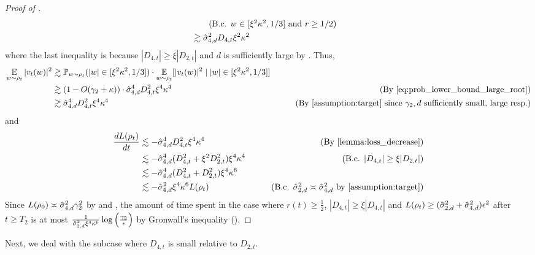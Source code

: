 \begin{proof}[Proof of ]
\begin{align}
& \tag{B.c. $\w \in [\xi^2 \kappa^2, 1/3]$ and $r \geq 1/2$} \\
& \gtrsim \sigmaCoeffFour^2 D_{4, t} \xi^2 \kappa^2
& \label{eq:vel_lower_bound_large_root}
\end{align}
where the last inequality is because $|D_{4, t}| \geq \xi |D_{2, t}|$ and $d$ is sufficiently large by . Thus,
\begin{align}
\E_{\w \sim \rho_t} |\vel_t(\w)|^2
& \gtrsim \Prob_{\w \sim \rho_t}(|\w| \in [\xi^2 \kappa^2, 1/3]) \cdot \E_{\w \sim \rho_t}[|\vel_t(\w)|^2 \mid |\w| \in [\xi^2 \kappa^2, 1/3]] \\
& \gtrsim (1 - O(\gamma_2 + \kappa)) \cdot \sigmaCoeffFour^4 D_{4, t}^2 \xi^4 \kappa^4
& \tag{By \Cref{eq:prob_lower_bound_large_root}} \\
& \gtrsim \sigmaCoeffFour^4 D_{4, t}^2 \xi^4 \kappa^4
& \tag{By \Cref{assumption:target} since $\gamma_2, d$ sufficiently small, large resp.}
\end{align}
and
\begin{align}
\frac{dL(\rho_t)}{dt}
& \lesssim - \sigmaCoeffFour^4 D_{4, t}^2 \xi^4 \kappa^4
& \tag{By \Cref{lemma:loss_decrease}} \\
& \lesssim -\sigmaCoeffFour^4 (D_{4, t}^2 + \xi^2 D_{2, t}^2 ) \xi^4 \kappa^4
& \tag{B.c. $|D_{4, t}| \geq \xi |D_{2, t}|$} \\
& \lesssim -\sigmaCoeffFour^4 (D_{4, t}^2 + D_{2, t}^2) \xi^4 \kappa^6 \\
& \lesssim -\sigmaCoeffFour^2 \xi^4 \kappa^6 L(\rho_t)
& \tag{B.c. $\sigmaCoeffTwo^2 \asymp \sigmaCoeffFour^2$ by \Cref{assumption:target}}
\end{align}
Since $L(\rho_0) \asymp \hat{\sigma}_{4, d}^2 \gamma_2^2$ by  and , the amount of time spent in the case where $r(t) \geq \frac{1}{2}$, $|D_{4, t}| \geq \xi |D_{4, t}|$ and $L(\rho_t) \geq (\hat{\sigma}_{2, d}^2 + \hat{\sigma}_{4, d}^2) \epsilon^2$ after $t \geq T_2$ is at most $\frac{1}{\hat{\sigma}_{2, d}^2 \xi^4 \kappa^6} \log\Big(\frac{\gamma_2}{\epsilon}\Big)$ by Gronwall's inequality ().
\end{proof}

Next, we deal with the subcase where $D_{4, t}$ is small relative to $D_{2, t}$.

